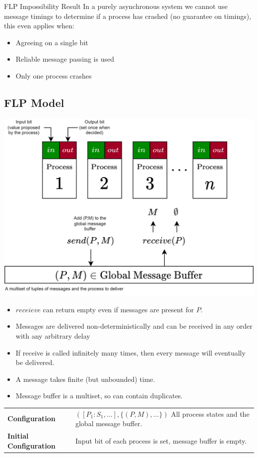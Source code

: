 \begin{definitionbox}{FLP Impossibility Result}
    In a purely asynchronous system we cannot use message timings to determine if a process has crashed (no guarantee on timings), this even applies when:
    \begin{itemize}
        \item Agreeing on a single bit
        \item Reliable message passing is used
        \item Only one process crashes
    \end{itemize}
\end{definitionbox}

\subsection{FLP Model}
\begin{center}
    \includegraphics[width=.8\textwidth]{consensus/images/flp_model.drawio.png}
\end{center}
\begin{itemize}
    \item $receieve$ can return empty even if messages are present for $P$.
    \item Messages are delivered non-deterministically and can be received in any order with any arbitrary delay
    \item If receive is called infinitely many times, then every message will eventually be delivered.
    \item A message takes finite (but unbounded) time.
    \item Message buffer is a multiset, so can contain duplicates.
\end{itemize}
\begin{center}
    \begin{tabular}{l p{}}
        \textbf{Configuration}         & $([P_1 : S_1, \dots], \{(P, M), \dots\})$ All process states and the global message buffer. \\
        \textbf{Initial Configuration} & Input bit of each process is set, message buffer is empty.                                  \\
    \end{tabular}
\end{center}
